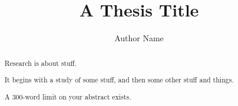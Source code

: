 
\title{A Thesis Title}
\author{Author Name}

\maketitle
\makedeclaration{}

\begin{abstract} %
Research is about stuff.

It begins with a study of some stuff, and then some other stuff and things.

A 300-word limit on your abstract exists.
\end{abstract}

